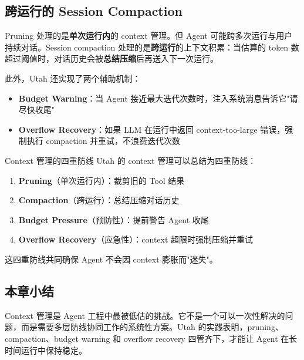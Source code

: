 \subsection{跨运行的 Session Compaction}

Pruning 处理的是\textbf{单次运行内}的 context 管理。但 Agent 可能跨多次运行与用户持续对话。Session compaction 处理的是\textbf{跨运行}的上下文积累：当估算的 token 数超过阈值时，对话历史会被\textbf{总结压缩}后再送入下一次运行。

此外，Utah 还实现了两个辅助机制：

\begin{itemize}
    \item \textbf{Budget Warning}：当 Agent 接近最大迭代次数时，注入系统消息告诉它"请尽快收尾"
    \item \textbf{Overflow Recovery}：如果 LLM 在运行中返回 context-too-large 错误，强制执行 compaction 并重试，不浪费迭代次数
\end{itemize}

\begin{knowledgebox}{Context 管理的四重防线}
Utah 的 context 管理可以总结为四重防线：
\begin{enumerate}
    \item \textbf{Pruning}（单次运行内）：裁剪旧的 Tool 结果
    \item \textbf{Compaction}（跨运行）：总结压缩对话历史
    \item \textbf{Budget Pressure}（预防性）：提前警告 Agent 收尾
    \item \textbf{Overflow Recovery}（应急性）：context 超限时强制压缩并重试
\end{enumerate}
这四重防线共同确保 Agent 不会因 context 膨胀而"迷失"。
\end{knowledgebox}

\subsection{本章小结}

Context 管理是 Agent 工程中最被低估的挑战。它不是一个可以一次性解决的问题，而是需要多层防线协同工作的系统性方案。Utah 的实践表明，pruning、compaction、budget warning 和 overflow recovery 四管齐下，才能让 Agent 在长时间运行中保持稳定。


